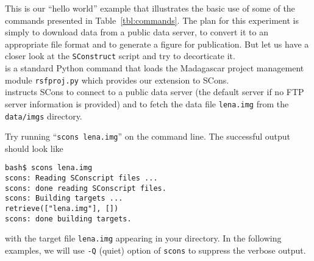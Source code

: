 %


This is our ``hello  world'' example that illustrates the basic use of
some of the commands presented in Table~\ref{tbl:commands}. The plan
for this experiment is simply to download data from a public data
server, to convert it to an appropriate file format and to generate a
figure for publication. But let us have a closer look at the
\texttt{SConstruct} script and try to decorticate it.\\


%
is a standard Python command that loads the Madagascar project
management module \texttt{rsfproj.py} which provides our extension to
SCons.\\


%
instructs SCons to connect to a public data server (the default server
if no FTP server information is provided) and to fetch the data file
\texttt{lena.img} from the \texttt{data/imgs} directory. 
\begin{comment}
Note that
Madagascar expects a \texttt{data} folder on top of the specified
directory (i.e.  \texttt{imgs}). In the directory where you have your
SConstruct, running \texttt{scons lena.img} on the command line will
download the file \texttt{lena.img}.  The equivalent command lines are
\footnote{use login: anonymous, password: anonymous}
\begin{verbatim}
bash$ ftp egl.beg.utexas.edu
ftp> bin
ftp> cd data/imgs
ftp> get lena.img
ftp> bye
\end{verbatim}
\end{comment}
%
Try running ``\texttt{scons lena.img}'' on the command line. The successful output should look like
\begin{verbatim}
bash$ scons lena.img
scons: Reading SConscript files ...
scons: done reading SConscript files.
scons: Building targets ...
retrieve(["lena.img"], [])
scons: done building targets.
\end{verbatim}
with the target file \texttt{lena.img} appearing in your directory.
In the following examples, we will use \texttt{-Q} (quiet) option of
\texttt{scons} to suppress the verbose output.

